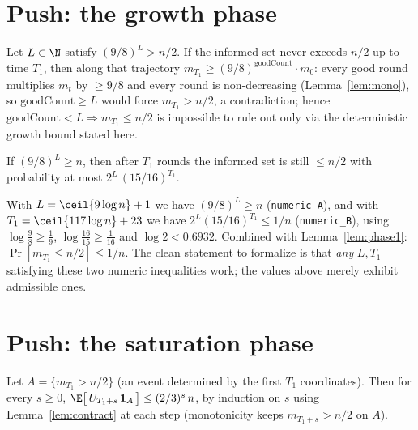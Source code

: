 \section{Push: the growth phase}\label{sec:growth}

\begin{lemma}\label{lem:force}
  \leanok
  Let $L \in \N$ satisfy $(9/8)^L > n/2$. If the informed set never exceeds
  $n/2$ up to time $T_1$, then along that trajectory
  $m_{T_1} \ge (9/8)^{\mathrm{goodCount}} \cdot m_0$: every good round
  multiplies $m_t$ by $\ge 9/8$ and every round is non-decreasing
  (Lemma~\ref{lem:mono}), so $\mathrm{goodCount} \ge L$ would force
  $m_{T_1} > n/2$, a contradiction; hence
  $\mathrm{goodCount} < L \Rightarrow m_{T_1} \le n/2$ is impossible to rule
  out only via the deterministic growth bound stated here.
\end{lemma}

\begin{lemma}[Phase 1]\label{lem:phase1}
  \leanok
  If $(9/8)^L \ge n$, then after $T_1$ rounds the informed set is still
  $\le n/2$ with probability at most $2^{L}\,(15/16)^{T_1}$.
\end{lemma}

\begin{lemma}\label{lem:constants}
  \leanok
  With $L = \ceil{9 \log n} + 1$ we have $(9/8)^L \ge n$
  (\texttt{numeric\_A}), and with $T_1 = \ceil{117 \log n} + 23$ we have
  $2^{L}(15/16)^{T_1} \le 1/n$ (\texttt{numeric\_B}), using
  $\log\tfrac98 \ge \tfrac19$, $\log\tfrac{16}{15} \ge \tfrac1{16}$ and
  $\log 2 < 0.6932$. Combined with Lemma~\ref{lem:phase1}:
  $\Pr[m_{T_1} \le n/2] \le 1/n$. The clean statement to formalize is that
  \emph{any} $L, T_1$ satisfying these two numeric inequalities work; the
  values above merely exhibit admissible ones.
\end{lemma}

\section{Push: the saturation phase}\label{sec:saturation}

\begin{lemma}[Phase 2]\label{lem:phase2}
  \leanok
  Let $A = \{m_{T_1} > n/2\}$ (an event determined by the first $T_1$
  coordinates). Then for every $s \ge 0$,
  $\E\bigl[\, U_{T_1 + s}\, \mathbf{1}_A \,\bigr] \le (2/3)^{s}\, n$, by
  induction on $s$ using Lemma~\ref{lem:contract} at each step (monotonicity
  keeps $m_{T_1+s} > n/2$ on $A$).
\end{lemma}

